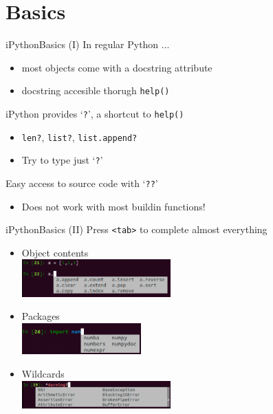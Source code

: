 \documentclass[10pt,compress]{beamer} %
\begin{document}
\section{Basics}
\begin{frame}{iPython}{Basics (I)}
    In regular Python ...
    \begin{itemize}
        \item most objects come with a docstring attribute
        \item docstring accesible thorugh \texttt{help()}
    \end{itemize}
    iPython provides `\texttt{?}', a shortcut to \texttt{help()}
    \begin{itemize}
        \item \texttt{len?}, \texttt{list?}, \texttt{list.append?}
        \item Try to type just `\texttt{?}'
    \end{itemize}
    Easy access to source code with `\texttt{??}'
    \begin{itemize}
        \item Does not work with most buildin functions!
    \end{itemize}
\end{frame}

\begin{frame}{iPython}{Basics (II)}
    Press \texttt{<tab>} to complete almost everything
    \begin{itemize}
        \item Object contents\\
	\includegraphics[width=0.45\textwidth]{figs/tab.png} 
        \item Packages\\
	\includegraphics[width=0.36\textwidth]{figs/tab2.png}	
        \item Wildcards\\
	\includegraphics[width=0.45\textwidth]{figs/tab3.png}	
    \end{itemize}
\end{frame}
\end{document}
